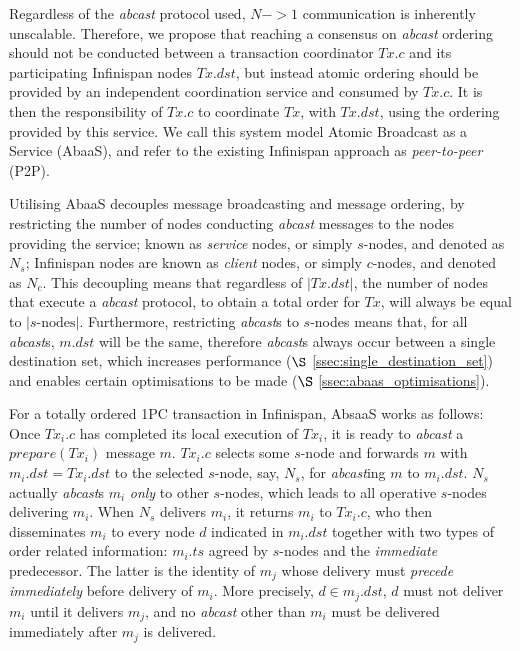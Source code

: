 Regardless of the \emph{abcast} protocol used, $N->1$ communication is inherently unscalable.  Therefore, we propose that reaching a consensus on \emph{abcast} ordering should not be conducted between a transaction coordinator $Tx.c$ and its participating Infinispan nodes $Tx.dst$, but instead atomic ordering should be provided by an independent coordination service and consumed by $Tx.c$.  It is then the responsibility of $Tx.c$ to coordinate $Tx$, with $Tx.dst$, using the ordering provided by this service.  We call this system model Atomic Broadcast as a Service (\textsf{AbaaS}), and refer to the existing Infinispan approach as \emph{peer-to-peer} (P2P).  

Utilising \textsf{AbaaS} decouples message broadcasting and message ordering, by restricting the number of nodes conducting \emph{abcast} messages to the nodes providing the service; known as \emph{service} nodes, or simply $s$-nodes, and denoted as $N_s$; Infinispan nodes are known as \emph{client} nodes, or simply $c$-nodes, and denoted as $N_c$.  This decoupling means that regardless of $\left\vert Tx.dst \right\vert$, the number of nodes that execute a \emph{abcast} protocol, to obtain a total order for $Tx$, will always be equal to $\left\vert s\text{-nodes}\right\vert$.  Furthermore, restricting \emph{abcast}s to $s$-nodes means that, for all \emph{abcast}s, $m.dst$ will be the same, therefore \emph{abcast}s always occur between a single destination set, which increases performance ($\S$ \ref{ssec:single_destination_set}) and enables certain optimisations to be made ($\S$ \ref{ssec:abaas_optimisations}).  

For a totally ordered 1PC transaction in Infinispan, \textsf{AbsaaS} works as follows: Once $Tx_i.c$ has completed its local execution of $Tx_i$, it is ready to \emph{abcast} a $prepare(Tx_i)$ message $m$.  $Tx_i.c$ selects some $s$-node and forwards $m$ with $m_i.dst = Tx_i.dst$ to the selected $s$-node, say, $N_s$, for \emph{abcast}ing $m$ to $m_i.dst$. $N_s$ actually \emph{abcast}s $m_i$ \emph{only} to other $s$-nodes, which leads to all operative $s$-nodes delivering $m_i$. When $N_s$ delivers $m_i$, it returns $m_i$ to $Tx_i.c$, who then disseminates $m_i$ to every node $d$ indicated in $m_i.dst$ together with two types of order related information: $m_i.ts$ agreed by $s$-nodes and the \emph{immediate} predecessor. The latter is the identity of $m_j$ whose delivery must \emph{precede} \emph{immediately} before delivery of $m_i$. More precisely, $d \in m_j.dst$, $d$ must not deliver $m_i$ until it delivers $m_j$, and no \emph{abcast} other than $m_i$ must be delivered immediately after $m_j$ is delivered.

